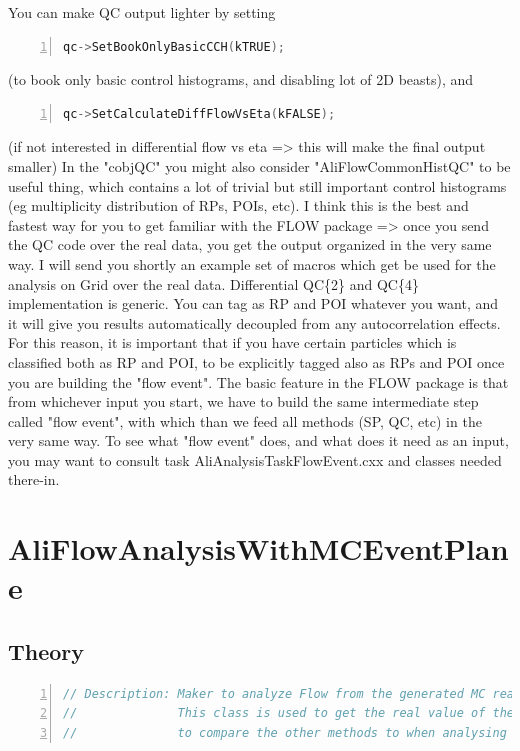 \documentclass[a4paper]{book}
\numberwithin{equation}{subsection}
\begin{document}
 You can make QC output lighter by setting 
 	\begin{lstlisting}[language=C, numbers=left]
qc->SetBookOnlyBasicCCH(kTRUE);	\end{lstlisting} 
(to book only basic control histograms, and disabling lot of 2D beasts), and 
	\begin{lstlisting}[language=C, numbers=left]
qc->SetCalculateDiffFlowVsEta(kFALSE); 	\end{lstlisting}
(if not interested in differential flow vs eta => this will make the final output smaller) 
 In the "cobjQC" you might also consider "AliFlowCommonHistQC" to be useful thing, which contains a lot of trivial but still important control histograms (eg multiplicity distribution of RPs, POIs, etc). 
 I think this is the best and fastest way for you to get familiar with the FLOW package => once you send the QC code over the real data, you get the output organized in the very same way. I will send you shortly an example set of macros which get be used for the analysis on Grid over the real data. 
 Differential QC\{2\} and QC\{4\} implementation is generic. You can tag as RP and POI whatever you want, and it will give you results automatically decoupled from any autocorrelation effects. For this reason, it is important that if you have certain particles which is classified both as RP and POI, to be explicitly tagged also as RPs and POI once you are building the "flow event". 
 The basic feature in the FLOW package is that from whichever input you start, we have to build the same intermediate step called "flow event", with which than we feed all methods (SP, QC, etc) in the very same way. 
 To see what "flow event" does, and what does it need as an input, you may want to consult task AliAnalysisTaskFlowEvent.cxx and classes needed there-in. 



 \section{AliFlowAnalysisWithMCEventPlane}

\subsection{Theory}
\begin{lstlisting}[language=C, numbers=left]
// Description: Maker to analyze Flow from the generated MC reaction plane.
//              This class is used to get the real value of the flow 
//              to compare the other methods to when analysing simulated events.\end{lstlisting}
\end{document}
